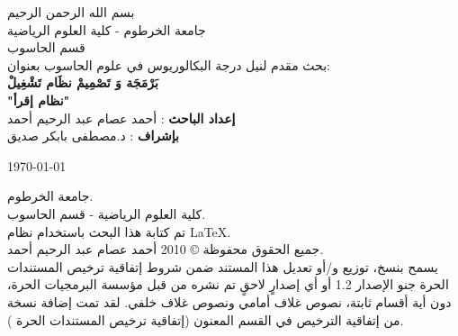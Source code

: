 \begin{titlepage}

\begin{center}

 بسم الله الرحمن الرحيم\\[0.8cm] 


جامعة الخرطوم - كلية العلوم الرياضية \\ قسم الحاسوب \\ [5cm]

\textsc{\Large بحث مقدم لنيل درجة البكالوريوس في علوم الحاسوب بعنوان:}\\[0.9cm]



{ \huge \textbf{بَرْمَجَة وَ تَصْمِيمْ نظَام تَشْغِيلْ\\[0.3cm] \large{"نظام إقرأ"}}}\\[3cm]




\textbf{إعداد الباحث} : أحمد عصام عبد الرحيم أحمد \\
\textbf{بإشراف} : د.مصطفى بابكر صديق



\vfill

{\large \today}

\end{center}

\clearpage
\thispagestyle{empty}

{ \phantom{.} \vspace{350pt} }
{\footnotesize
جامعة الخرطوم.\\
كلية العلوم الرياضية - قسم الحاسوب.\\
تم كتابة هذا البحث باستخدام  نظام \LaTeX  {}.\\
جميع الحقوق محفوظة \copyright  {} 2010 أحمد عصام عبد الرحيم أحمد.\\

يسمح بنسخ، توزيع و/أو تعديل هذا المستند ضمن شروط إتفاقية ترخيص المستندات الحرة جنو الإصدار  1.2 أو أي إصدارٍ لاحقٍ تم نشره من قبل مؤسسة البرمجيات الحرة، دون أية أقسام ثابتة، نصوص غلاف  أمامي ونصوص غلاف خلفي. لقد تمت إضافة نسخة من إتفاقية الترخيص في القسم المعنون (إتفاقية  ترخيص المستندات الحرة ).
}

\end{titlepage}